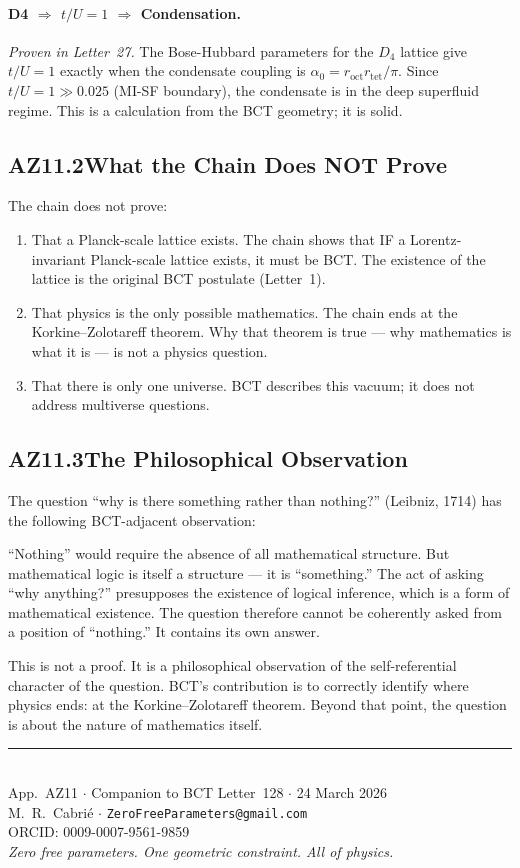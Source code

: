 \documentclass[aps,prl,twocolumn,showpacs,preprintnumbers]{revtex4-2}
\newcommand{\roct}{r_{\mathrm{oct}}}
\newcommand{\rtet}{r_{\mathrm{tet}}}
\newcommand{\azero}{\alpha_0}
\begin{document}
\paragraph{D4 $\Rightarrow$ $t/U = 1$ $\Rightarrow$ Condensation.}
\textit{Proven in Letter~27.}
The Bose-Hubbard parameters for the $D_4$ lattice give $t/U = 1$
exactly when the condensate coupling is $\azero = \roct\rtet/\pi$.
Since $t/U = 1 \gg 0.025$ (MI-SF boundary), the condensate is
in the deep superfluid regime. This is a calculation from
the BCT geometry; it is solid.

\subsection*{AZ11.2\quad What the Chain Does NOT Prove}

The chain does not prove:
\begin{enumerate}
  \item That a Planck-scale lattice exists. The chain shows that
    IF a Lorentz-invariant Planck-scale lattice exists, it must
    be BCT. The existence of the lattice is the
    original BCT postulate (Letter~1).
  \item That physics is the only possible mathematics. The chain
    ends at the Korkine--Zolotareff theorem. Why that theorem is true --- why
    mathematics is what it is --- is not a physics question.
  \item That there is only one universe. BCT describes this vacuum;
    it does not address multiverse questions.
\end{enumerate}

\subsection*{AZ11.3\quad The Philosophical Observation}

The question ``why is there something rather than nothing?''
(Leibniz, 1714) has the following BCT-adjacent observation:

``Nothing'' would require the absence of all mathematical structure.
But mathematical logic is itself a structure --- it is ``something.''
The act of asking ``why anything?'' presupposes the existence of
logical inference, which is a form of mathematical existence.
The question therefore cannot be coherently asked from a position
of ``nothing.'' It contains its own answer.

This is not a proof. It is a philosophical observation of the
self-referential character of the question. BCT's contribution
is to correctly identify where physics ends: at the
Korkine--Zolotareff theorem. Beyond that point, the question is about the nature
of mathematics itself.

\bigskip
\begin{center}
\rule{0.5\textwidth}{0.4pt}\\[4pt]
App.~AZ11 $\cdot$ Companion to BCT Letter~128 $\cdot$
24 March 2026\\
M.~R.~Cabri\'e $\cdot$ \texttt{ZeroFreeParameters@gmail.com}\\
ORCID: 0009-0007-9561-9859\\[2pt]
\textit{Zero free parameters. One geometric constraint.
All of physics.}
\end{center}
\end{document}
